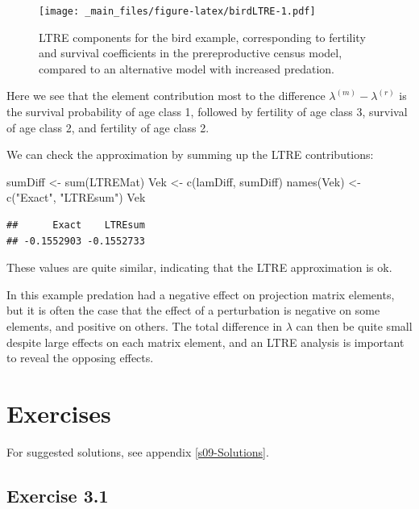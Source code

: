 \documentclass[
]{book}
\newenvironment{Shaded}{\begin{snugshade}}{\end{snugshade}}
\newcommand{\FunctionTok}[1]{\textcolor[rgb]{0.00,0.00,0.00}{#1}}
\newcommand{\NormalTok}[1]{#1}
\newcommand{\OtherTok}[1]{\textcolor[rgb]{0.56,0.35,0.01}{#1}}
\newcommand{\StringTok}[1]{\textcolor[rgb]{0.31,0.60,0.02}{#1}}
\begin{document}
\begin{figure}
\centering
\texttt{[image: \_main\_files/figure-latex/birdLTRE-1.pdf]}
\caption{\label{fig:birdLTRE}LTRE components for the bird example, corresponding to fertility and survival coefficients in the prereproductive census model, compared to an alternative model with increased predation.}
\end{figure}

Here we see that the element contribution most to the difference \(\lambda^{(m)}-\lambda^{(r)}\) is the survival probability of age class 1, followed by fertility of age class 3, survival of age class 2, and fertility of age class 2.

We can check the approximation by summing up the LTRE contributions:

\begin{Shaded}
\begin{Highlighting}[]
\NormalTok{sumDiff }\OtherTok{\textless{}{-}} \FunctionTok{sum}\NormalTok{(LTREMat)}
\NormalTok{Vek }\OtherTok{\textless{}{-}} \FunctionTok{c}\NormalTok{(lamDiff, sumDiff)}
\FunctionTok{names}\NormalTok{(Vek) }\OtherTok{\textless{}{-}} \FunctionTok{c}\NormalTok{(}\StringTok{"Exact"}\NormalTok{, }\StringTok{"LTREsum"}\NormalTok{)}
\NormalTok{Vek}
\end{Highlighting}
\end{Shaded}

\begin{verbatim}
##      Exact    LTREsum 
## -0.1552903 -0.1552733
\end{verbatim}

These values are quite similar, indicating that the LTRE approximation is ok.

In this example predation had a negative effect on projection matrix elements, but it is often the case that the effect of a perturbation is negative on some elements, and positive on others. The total difference in \(\lambda\) can then be quite small despite large effects on each matrix element, and an LTRE analysis is important to reveal the opposing effects.

\hypertarget{exercises-2}{%
\section{Exercises}\label{exercises-2}}

For suggested solutions, see appendix \ref{s09-Solutions}.

\hypertarget{exercise-3.1}{%
\subsection*{Exercise 3.1}\label{exercise-3.1}}
\end{document}
